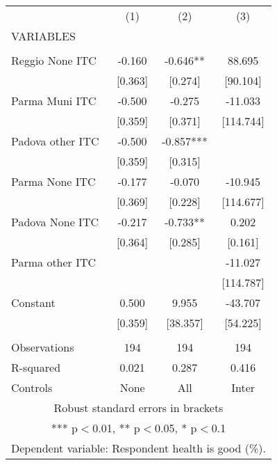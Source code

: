 \begin{tabular}{lccc} \hline
 & (1) & (2) & (3) \\
VARIABLES &  &  &  \\ \hline
 &  &  &  \\
Reggio None ITC & -0.160 & -0.646** & 88.695 \\
 & [0.363] & [0.274] & [90.104] \\
Parma Muni ITC & -0.500 & -0.275 & -11.033 \\
 & [0.359] & [0.371] & [114.744] \\
Padova other ITC & -0.500 & -0.857*** &  \\
 & [0.359] & [0.315] &  \\
Parma None ITC & -0.177 & -0.070 & -10.945 \\
 & [0.369] & [0.228] & [114.677] \\
Padova None ITC & -0.217 & -0.733** & 0.202 \\
 & [0.364] & [0.285] & [0.161] \\
Parma other ITC &  &  & -11.027 \\
 &  &  & [114.787] \\
Constant & 0.500 & 9.955 & -43.707 \\
 & [0.359] & [38.357] & [54.225] \\
 &  &  &  \\
Observations & 194 & 194 & 194 \\
R-squared & 0.021 & 0.287 & 0.416 \\
 Controls & None & All & Inter \\ \hline
\multicolumn{4}{c}{ Robust standard errors in brackets} \\
\multicolumn{4}{c}{ *** p$<$0.01, ** p$<$0.05, * p$<$0.1} \\
\multicolumn{4}{c}{ Dependent variable: Respondent health is good (\%).} \\
\end{tabular}
